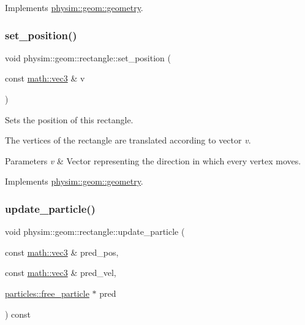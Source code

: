 Implements \hyperlink{classphysim_1_1geom_1_1geometry_ab7aa1a32927e96ed384a93b84fbd62b7}{physim\+::geom\+::geometry}.

\mbox{\label{classphysim_1_1geom_1_1rectangle_a4e9fda61b51ce89fc073f880a7823a55}} 
\subsubsection{\texorpdfstring{set\+\_\+position()}{set\_position()}}
{\footnotesize\ttfamily void physim\+::geom\+::rectangle\+::set\+\_\+position (\begin{DoxyParamCaption}\item[{const \hyperlink{structphysim_1_1math_1_1vec3}{math\+::vec3} \&}]{v }\end{DoxyParamCaption})\hspace{0.3cm}{\ttfamily [virtual]}}



Sets the position of this rectangle. 

The vertices of the rectangle are translated according to vector {\itshape v}. 
\begin{DoxyParams}{Parameters}
{\em v} & Vector representing the direction in which every vertex moves. \\
\hline
\end{DoxyParams}


Implements \hyperlink{classphysim_1_1geom_1_1geometry_adbd7c270a0b49c2c6d085457a20bfa69}{physim\+::geom\+::geometry}.

\mbox{\label{classphysim_1_1geom_1_1rectangle_adb8cbc4dfa566b8174f2cf25bbc90afe}} 
\subsubsection{\texorpdfstring{update\+\_\+particle()}{update\_particle()}}
{\footnotesize\ttfamily void physim\+::geom\+::rectangle\+::update\+\_\+particle (\begin{DoxyParamCaption}\item[{const \hyperlink{structphysim_1_1math_1_1vec3}{math\+::vec3} \&}]{pred\+\_\+pos,  }\item[{const \hyperlink{structphysim_1_1math_1_1vec3}{math\+::vec3} \&}]{pred\+\_\+vel,  }\item[{\hyperlink{classphysim_1_1particles_1_1free__particle}{particles\+::free\+\_\+particle} $\ast$}]{pred }\end{DoxyParamCaption}) const\hspace{0.3cm}{\ttfamily [virtual]}}



